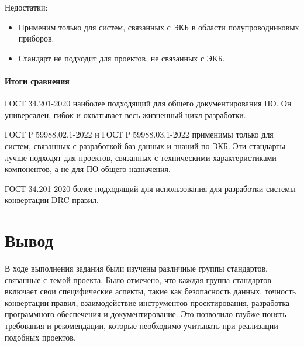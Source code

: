 Недостатки:

\begin{itemize}
	\item Применим только для систем,
		связанных с ЭКБ в области полупроводниковых приборов.
	\item Стандарт не подходит для проектов, не связанных с ЭКБ.
\end{itemize}

\paragraph{Итоги сравнения}

ГОСТ 34.201-2020 наиболее подходящий для общего документирования ПО.
Он универсален, гибок и охватывает весь жизненный цикл разработки.

ГОСТ Р 59988.02.1-2022 и ГОСТ Р 59988.03.1-2022 применимы только для систем,
связанных с разработкой баз данных и знаний по ЭКБ.
Эти стандарты лучше подходят для проектов,
связанных с техническими характеристиками компонентов,
а не для ПО общего назначения. 

ГОСТ 34.201-2020 более подходящий для использования
для разработки системы конвертации DRC правил.

\clearpage

\section*{\LARGE Вывод}

В ходе выполнения задания были изучены различные группы стандартов,
связанные с темой проекта.
Было отмечено, что каждая группа стандартов включает
свои специфические аспекты,
такие как безопасность данных, точность конвертации правил,
взаимодействие инструментов проектирования,
разработка программного обеспечения и документирование.
Это позволило глубже понять требования и рекомендации,
которые необходимо учитывать при реализации подобных проектов.


